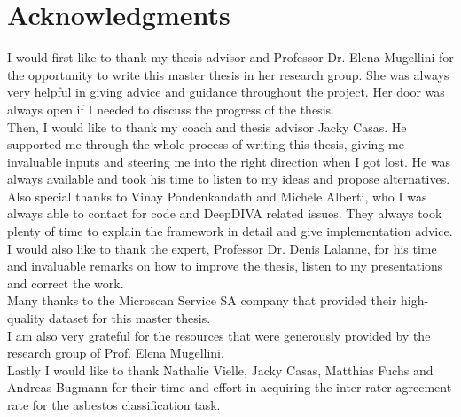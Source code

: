 \documentclass[11pt,a4paper,twoside,hidelinks,openright]{rvsmaster}
\makeatletter
\def\cleardoublepage{\clearpage\if@twoside \ifodd\c@page\else
	\hbox{}
	\thispagestyle{empty}
	\newpage
\fi\fi}
\makeatother
\begin{document}
\tableofcontents{}
\listoffigures{}
\listoftables{}



\chapter*{Acknowledgments}

I would first like to thank my thesis advisor and Professor Dr. Elena Mugellini for the opportunity to write this master thesis in her research group. She was always very helpful in giving advice and guidance throughout the project. Her door was always open if I needed to discuss the progress of the thesis.\\


Then, I would like to thank my coach and thesis advisor Jacky Casas. He supported me through the whole process of writing this thesis, giving me invaluable inputs and steering me into the right direction when I got lost. He was always available and took his time to listen to my ideas and propose alternatives.\\


Also special thanks to Vinay Pondenkandath and Michele Alberti, who I was always able to contact for code and DeepDIVA related issues. They always took plenty of time to explain the framework in detail and give implementation advice.\\


I would also like to thank the expert, Professor Dr. Denis Lalanne, for his time and invaluable remarks on how to improve the thesis, listen to my presentations and correct the work. \\


Many thanks to the Microscan Service SA company that provided their high-quality dataset for this master thesis.\\


I am also very grateful for the resources that were generously provided by the research group of Prof. Elena Mugellini.  \\

Lastly I would like to thank Nathalie Vielle, Jacky Casas, Matthias Fuchs and Andreas Bugmann for their time and effort in acquiring the inter-rater agreement rate for the asbestos classification task.

\cleardoublepage
\setcounter{page}{1}	%













\end{document}
